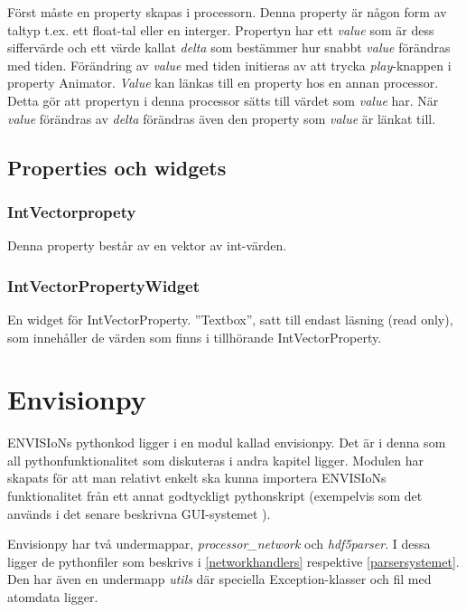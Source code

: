 \documentclass[10pt,oneside,swedish]{article}
\begin{document}
Först måste en property skapas i processorn. Denna property är någon form av taltyp t.ex. ett float-tal eller en interger. Propertyn har ett \emph{value} som är dess siffervärde och ett värde kallat \emph{delta} som bestämmer hur snabbt \emph{value} förändras med tiden. Förändring av \emph{value} med tiden initieras av att trycka \emph{play}-knappen i property Animator. \emph{Value} kan länkas till en property hos en annan processor. Detta gör att propertyn i denna processor sätts till värdet som \emph{value} har. När \emph{value} förändras av \emph{delta} förändras även den property som \emph{value} är länkat till.

\subsection{Properties och widgets}\label{properties-och-widgets}

\subsubsection{IntVectorpropety}\label{intvectorpropety}

Denna property består av en vektor av int-värden.

\subsubsection{IntVectorPropertyWidget}\label{intvectorpropertywidget}

En widget för IntVectorProperty. ''Textbox'', satt till endast läsning
(read only), som innehåller de värden som finns i tillhörande
IntVectorProperty.

\newpage
\section{Envisionpy}\label{envisionpy}

ENVISIoNs pythonkod ligger i en modul kallad envisionpy. Det är i denna
som all pythonfunktionalitet som diskuteras i andra kapitel ligger.
Modulen har skapats för att man relativt enkelt ska kunna importera
ENVISIoNs funktionalitet från ett annat godtyckligt pythonskript
(exempelvis som det används i det senare beskrivna GUI-systemet \cite{GUI}).

Envisionpy har två undermappar, \emph{processor\_network} och
\emph{hdf5parser}. I dessa ligger de pythonfiler som beskrivs i \ref{networkhandlers}
respektive \ref{parsersystemet}. Den har även en undermapp
\emph{utils} där speciella Exception-klasser och fil med atomdata
ligger.
\end{document}
